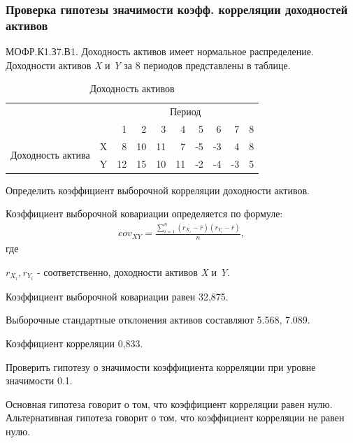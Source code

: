 \documentclass[12pt, table, a4paper,twoside]{exam}
\begin{document}
\begin{questions}
\subsubsection{Проверка гипотезы значимости коэфф. корреляции доходностей активов}
\question[20] МОФР.К1.З7.В1. Доходность активов имеет нормальное распределение. Доходности активов \textit{X} и \textit{Y} за 8 периодов представлены в таблице.
\begin{table}[H]
	\centering
	\caption{Доходность активов}
	\begin{tabular}{lcrrrrrrrr}
		\toprule
		\multicolumn{2}{c}{\multirow{2}[1]{*}{}} & \multicolumn{8}{c}{Период} \\ \cmidrule{3-10}
		\multicolumn{2}{c}{} & 1 & 2 & 3 & 4 & 5 & 6 & 7 & 8 \\
		\midrule
		\multicolumn{1}{l}{\multirow{2}[1]{*}{Доходность актива}} & X & 8 & 10 & 11 & 7 & -5 & -3 & 4 & 8 \\
		\multicolumn{1}{l}{} & Y & 12 & 15 & 10 & 11 & -2 & -4 & -3 & 5 \\
		\bottomrule
	\end{tabular}%
	\label{tab:addlabel}%
\end{table}%
\noaddpoints
\begin{subparts}
	\subpart[10] Определить коэффициент выборочной корреляции доходности активов.
	
	\begin{solution}[2em]
		Коэффициент выборочной ковариации  определяется по формуле:
		\begin{align*}
		cov_{XY}=\frac{\sum_{i=1}^n \left(r_{X_i}-\overline{r} \right)\left(r_{Y_i}-\overline{r} \right)}{n},
		\end{align*}
		где 
		
		$r_{X_i}, r_{Y_i}$ - соответственно, доходности активов \textit{X} и \textit{Y}.

	Коэффициент выборочной ковариации равен 32,875.

	Выборочные стандартные отклонения активов составляют 5.568, 7.089.
	
	Коэффициент корреляции 0,833.
	\end{solution}
	
	\subpart[10] Проверить гипотезу о значимости коэффициента корреляции при уровне значимости 0.1.
	
	\begin{solution}[4em]

	\raggedright
	Основная гипотеза говорит о том, что коэффициент корреляции равен нулю. Альтернативная гипотеза говорит о том, что коэффициент корреляции не равен нулю.
	

\end{solution}
\end{subparts}
\end{questions}
\end{document}
